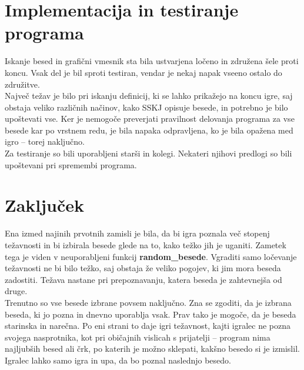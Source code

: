 \documentclass [a4paper, 12pt] {article}
\begin{document}
\section {Implementacija in testiranje programa}
Iskanje besed in grafični vmesnik sta bila ustvarjena ločeno in združena šele proti koncu. Vsak del je bil sproti testiran, vendar je nekaj napak vseeno ostalo do združitve. \\
Največ težav je bilo pri iskanju definicij, ki se lahko prikažejo na koncu igre, saj obstaja veliko različnih načinov, kako SSKJ opisuje besede, in potrebno je bilo upoštevati vse. Ker je nemogoče preverjati pravilnost delovanja programa za vse besede kar po vrstnem redu, je bila napaka odpravljena, ko je bila opažena med igro -- torej naključno. \\
Za testiranje so bili uporabljeni starši in kolegi. Nekateri njihovi predlogi so bili upoštevani pri spremembi programa.

\section {Zaključek}
Ena izmed najinih prvotnih zamisli je bila, da bi igra poznala več stopenj težavnosti in bi izbirala besede glede na to, kako težko jih je uganiti. Zametek tega je viden v neuporabljeni funkcij \textbf {random\_besede}. Vgraditi samo ločevanje težavnosti ne bi bilo težko, saj obstaja že veliko pogojev, ki jim mora beseda zadostiti. Težava nastane pri prepoznavanju, katera beseda je zahtevnejša od druge. \\
Trenutno so vse besede izbrane povsem naključno. Zna se zgoditi, da je izbrana beseda, ki jo pozna in dnevno uporablja vsak. Prav tako je mogoče, da je beseda starinska in narečna. Po eni strani to daje igri težavnost, kajti igralec ne pozna svojega nasprotnika, kot pri običajnih vislicah s prijatelji -- program nima najljubših besed ali črk, po katerih je možno sklepati, kakšno besedo si je izmislil. Igralec lahko samo igra in upa, da bo poznal naslednjo besedo. 
\end{document}
